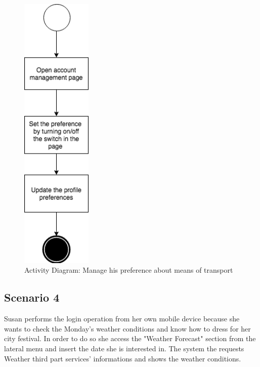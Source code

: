 \documentclass[numbers=noenddot, 12pt, a4paper, oneside]{scrbook}
\begin{document}
\begin{figure}[H]
	\centering
	\includegraphics[width=0.3\textwidth]{flows/Scenario3}
	\caption{Activity Diagram: Manage his preference about means of transport}
\end{figure}
\newpage

\subsection*{Scenario 4}

Susan performs the login operation from her own mobile device because she wants to check the Monday's weather conditions and know how to dress for her city festival. In order to do so she access the "Weather Forecast" section from the lateral menu and insert the date she is interested in. The system the requests Weather third part services' informations and shows the weather conditions.
\\
\end{document}
